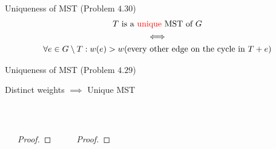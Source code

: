 
\begin{frame}{}
  \begin{exampleblock}{Uniqueness of MST (Problem $4.30$)}
    \vspace{-0.30cm}
    \begin{gather*}
      T \text{ is a \textcolor{red}{unique} MST of } G \\
      \iff \\
      \forall e \in G \setminus T:
      w(e) > w(\text{every other edge on the cycle in $T + e$})
    \end{gather*}
  \end{exampleblock}
  
  \vspace{0.50cm}
  \begin{exampleblock}{Uniqueness of MST (Problem $4.29$)}
    \centerline{Distinct weights $\implies$ Unique MST}
  \end{exampleblock}

  \pause
  \vspace{0.30cm}
  \begin{center}
     \\[12pt]
  \end{center}
\end{frame}

\begin{frame}{}
  {\centerline{}}
\end{frame}

\begin{frame}{}
  \begin{columns}
      \begin{theorem}
      \end{theorem}

      \begin{proof}
      \end{proof}
    \pause
      \begin{theorem}
      \end{theorem}

      \pause
      \begin{proof}
      \end{proof}
  \end{columns}
\end{frame}

